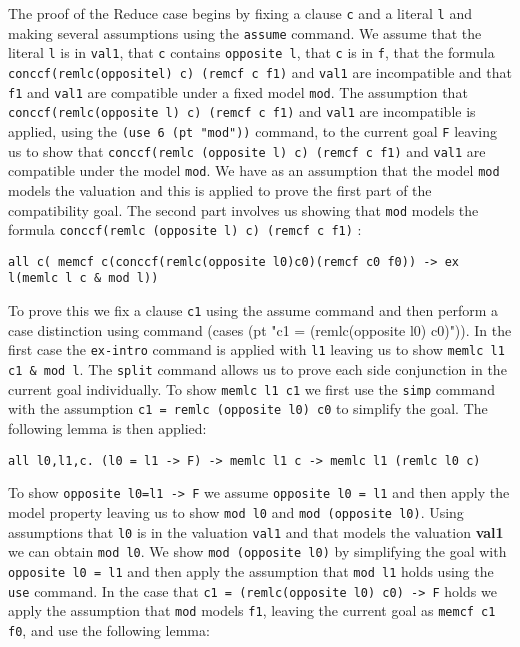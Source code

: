 The proof of the Reduce case begins by fixing a clause \texttt{c} and a literal \texttt{l} and making several assumptions using the \texttt{assume} command. We assume that the literal \texttt{l} is in \texttt{val1}, that \texttt{c} contains \texttt{opposite l}, that \texttt{c} is in \texttt{f}, that the formula \texttt{conccf(remlc(oppositel) c) (remcf c f1)} and \texttt{val1} are incompatible and that \texttt{f1} and \texttt{val1} are compatible under a fixed model \texttt{mod}. The assumption that \texttt{conccf(remlc(opposite l) c) (remcf c f1)} and \texttt{val1} are incompatible is applied, using the \texttt{(use 6 (pt "mod"))} command, to the current goal \texttt{F} leaving us to show that \texttt{conccf(remlc (opposite l) c) (remcf c f1)}  and \texttt{val1} are compatible under the model \texttt{mod}. We have as an assumption that the model \texttt{mod} models the valuation and this is applied to prove the first part of the compatibility goal. The second part involves us showing that \texttt{mod} models the formula \texttt{conccf(remlc (opposite l) c) (remcf c f1)} :
\begin{center}
\texttt{all c(
      memcf c(conccf(remlc(opposite l0)c0)(remcf c0 f0)) ->
      ex l(memlc l c \& mod l))}
\end{center}

To prove this we fix a clause \texttt{c1} using the assume command and then perform a case distinction using command (cases (pt "c1 = (remlc(opposite l0) c0)")).  In the first case the \texttt{ex-intro} command is applied with \texttt{l1} leaving us to show \texttt{memlc l1 c1 \& mod l}. The \texttt{split} command allows us to prove each side conjunction in the current goal individually. To show \texttt{memlc l1 c1} we first use the \texttt{simp} command with the assumption \texttt{c1 = remlc (opposite l0) c0} to simplify the goal. The following lemma is then applied:
\begin{center}
\texttt{all l0,l1,c.  (l0 = l1 -> F) -> memlc l1 c -> memlc l1 (remlc l0 c)}
\end{center}

To show \texttt{opposite l0=l1 -> F} we assume \texttt{opposite l0 = l1} and then apply the model property leaving us to show \texttt{mod l0} and \texttt{mod (opposite l0)}. Using assumptions that \texttt{l0} is in the valuation \texttt{val1} and that  models the valuation \textbf{val1} we can obtain \texttt{mod l0}. We show \texttt{mod (opposite l0)} by simplifying the goal with \texttt{opposite l0 = l1} and then apply the assumption that \texttt{mod l1} holds using the \texttt{use} command.  In the case that \texttt{c1 = (remlc(opposite l0) c0) -> F} holds we apply the assumption that \texttt{mod} models \texttt{f1}, leaving the current goal as \texttt{memcf c1 f0}, and use the following lemma:

